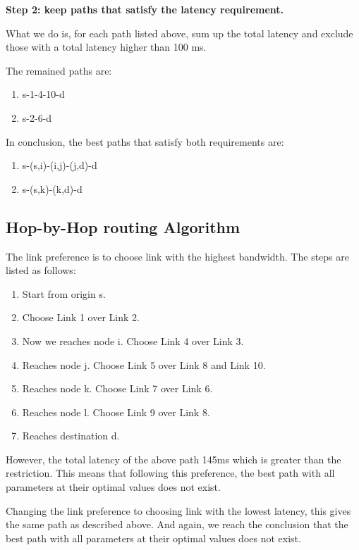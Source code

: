 \textbf{Step 2: keep paths that satisfy the latency requirement.}

What we do is, for each path listed above, sum up the total latency and exclude those with a total latency higher than 100 ms.

The remained paths are:
\begin{enumerate}
\item s-1-4-10-d
\item s-2-6-d
\end{enumerate}

In conclusion, the best paths that satisfy both requirements are:

\begin{enumerate}
\item s-(s,i)-(i,j)-(j,d)-d
\item s-(s,k)-(k,d)-d
\end{enumerate}


\subsection{Hop-by-Hop routing Algorithm}

The link preference is to choose link with the highest bandwidth. The steps are listed as follows:

\begin{enumerate}
\item Start from origin s.
\item Choose Link 1 over Link 2.
\item Now we reaches node i. Choose Link 4 over Link 3.
\item Reaches node j. Choose Link 5 over Link 8 and Link 10.
\item Reaches node k. Choose Link 7 over Link 6.
\item Reaches node l. Choose Link 9 over Link 8.
\item Reaches destination d.
\end{enumerate}

However, the total latency of the above path 145ms which is greater than the restriction. This means that following this preference, the best path with all parameters at their optimal values does not exist.

Changing the link preference to choosing link with the lowest latency, this gives the same path as described above. And again, we reach the conclusion that the best path with all parameters at their optimal values does not exist.











